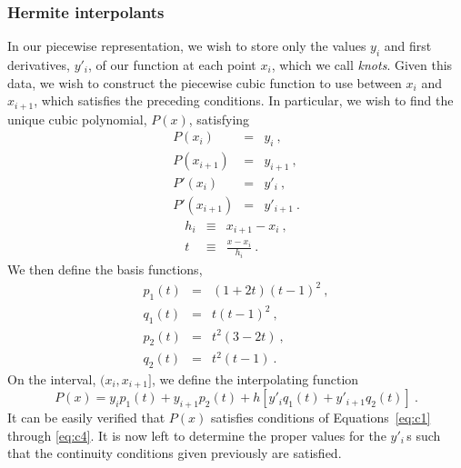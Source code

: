 \subsubsection{Hermite interpolants}
In our piecewise representation, we wish to store only the values
$y_i$ and first derivatives, $y'_i$, of our function at each point
$x_i$, which we call {\em knots}.  Given this data, we wish to
construct the piecewise cubic function to use between $x_i$ and
$x_{i+1}$, which satisfies the preceding conditions.  In particular, we
wish to find the unique cubic polynomial, $P(x)$, satisfying
\begin{eqnarray}
P(x_i)      & = & y_i      \label{eq:c1}\:, \\
P(x_{i+1})  & = & y_{i+1}  \label{eq:c2}\:, \\
P'(x_i)     & = & y'_i     \label{eq:c3}\:, \\
P'(x_{i+1}) & = & y'_{i+1} \label{eq:c4}\:.
\end{eqnarray}
\begin{eqnarray}
h_i & \equiv & x_{i+1} - {x_i}\:, \\
t & \equiv & \frac{x-x_i}{h_i}\:.
\end{eqnarray}
We then define the basis functions,
\begin{eqnarray}
p_1(t) & = & (1+2t)(t-1)^2  \label{eq:p1}\:, \\
q_1(t) & = & t (t-1)^2\:,       \\
p_2(t) & = & t^2(3-2t)\:,       \\
q_2(t) & = & t^2(t-1)\:.       \label{eq:q2}
\end{eqnarray}
On the interval, $(x_i, x_{i+1}]$, we define the interpolating
function
\begin{equation}
P(x) = y_i p_1(t) + y_{i+1}p_2(t) + h\left[y'_i q_1(t) + y'_{i+1} q_2(t)\right]\:. 
\end{equation}
It can be easily verified that $P(x)$ satisfies conditions of Equations~\ref{eq:c1}
through \ref{eq:c4}.  It is now left to
determine the proper values for the $y'_i\,$s such that the continuity
conditions given previously are satisfied.

